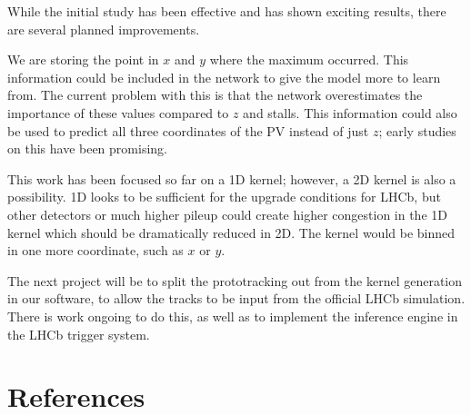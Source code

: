 \documentclass[a4paper]{jpconf}
\begin{document}
While the initial study has been effective and has shown exciting results, there are several planned improvements.

We are storing the point in $x$ and $y$ where the maximum occurred. This information could be included in the network to give the model more to learn from. The current problem with this is that the network overestimates the importance of these values compared to $z$ and stalls. This information could also be used to predict all three coordinates of the PV instead of just $z$; early studies on this have been promising.

This work has been focused so far on a 1D kernel; however, a 2D kernel is also a possibility. 1D looks to be sufficient for the upgrade conditions for LHCb, but other detectors or much higher pileup could create higher congestion in the 1D kernel which should be dramatically reduced in 2D. The kernel would be binned in one more coordinate, such as $x$ or $y$.

The next project will be to split the prototracking out from the kernel generation in our software, to allow the tracks to be input from the official LHCb simulation. There is work ongoing to do this, as well as to implement the inference engine in the LHCb trigger system.

\section*{References}


\end{document}
